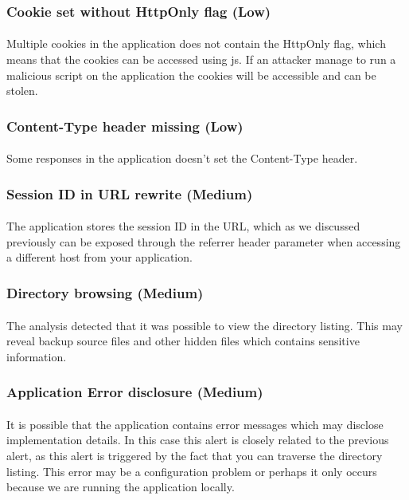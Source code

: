 \documentclass[11pt,english,a4paper]{report}
\begin{document}
\subsubsection{Cookie set without HttpOnly flag (Low)}
\paragraph{}
Multiple cookies in the application does not contain the HttpOnly flag, which means that the cookies can be accessed using \gls{js}.
If an attacker manage to run a malicious script on the application the cookies will be accessible and can be stolen.

\subsubsection{Content-Type header missing (Low)}
\paragraph{}
Some responses in the application doesn't set the Content-Type header.

\subsubsection{Session ID in URL rewrite (Medium)}
\paragraph{}
The application stores the session ID in the URL, which as we discussed previously can be exposed through the referrer header parameter when accessing a different host from your application.

\subsubsection{Directory browsing (Medium)}
\paragraph{}
The analysis detected that it was possible to view the directory listing.
This may reveal backup source files and other hidden files which contains sensitive information.

\subsubsection{Application Error disclosure (Medium)}
\paragraph{}
It is possible that the application contains error messages which may disclose implementation details. 
In this case this alert is closely related to the previous alert, as this alert is triggered by the fact that you can traverse the directory listing. 
This error may be a configuration problem or perhaps it only occurs because we are running the application locally.
\end{document}
